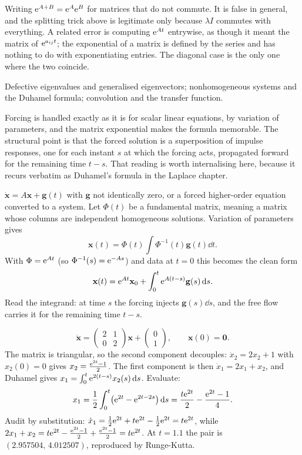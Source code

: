 \begin{trap}
Writing $\mathrm{e}^{A+B}=\mathrm{e}^{A}\mathrm{e}^{B}$ for matrices that do not commute. It is false in general, and the splitting trick above is legitimate only because $\lambda I$ commutes with everything. A related error is computing $\mathrm{e}^{At}$ entrywise, as though it meant the matrix of $\mathrm{e}^{a_{ij}t}$; the exponential of a matrix is defined by the series and has nothing to do with exponentiating entries. The diagonal case is the only one where the two coincide.
\end{trap}

\begin{seealsob}Defective eigenvalues and generalised eigenvectors; nonhomogeneous systems and the Duhamel formula; convolution and the transfer function.\end{seealsob}

Forcing is handled exactly as it is for scalar linear equations, by variation of parameters, and the matrix exponential makes the formula memorable. The structural point is that the forced solution is a superposition of impulse responses, one for each instant $s$ at which the forcing acts, propagated forward for the remaining time $t-s$. That reading is worth internalising here, because it recurs verbatim as Duhamel's formula in the Laplace chapter.

\cue $\dot{\mathbf{x}}=A\mathbf{x}+\mathbf{g}(t)$ with $\mathbf{g}$ not identically zero, or a forced higher-order equation converted to a system.
\method Let $\Phi(t)$ be a fundamental matrix, meaning a matrix whose columns are independent homogeneous solutions. Variation of parameters gives
\[\mathbf{x}(t)=\Phi(t)\int\Phi^{-1}(t)\mathbf{g}(t)\dd t.\]
With $\Phi=\mathrm{e}^{At}$ (so $\Phi^{-1}(s)=\mathrm{e}^{-As}$) and data at $t=0$ this becomes the clean form
\[\mathbf{x}(t)=\mathrm{e}^{At}\mathbf{x}_0+\int_0^{t}\mathrm{e}^{A(t-s)}\mathbf{g}(s)\,\mathrm{d} s.\]
Read the integrand: at time $s$ the forcing injects $\mathbf{g}(s)\dd s$, and the free flow carries it for the remaining time $t-s$.

\begin{worked}
\[\dot{\mathbf{x}}=\begin{pmatrix}2&1\\0&2\end{pmatrix}\mathbf{x}+\begin{pmatrix}0\\1\end{pmatrix},\qquad \mathbf{x}(0)=\mathbf{0}.\]
The matrix is triangular, so the second component decouples: $\dot x_2=2x_2+1$ with $x_2(0)=0$ gives $x_2=\tfrac{\mathrm{e}^{2t}-1}{2}$. The first component is then $\dot x_1=2x_1+x_2$, and Duhamel gives $x_1=\int_0^{t}\mathrm{e}^{2(t-s)}x_2(s)\,\mathrm{d} s$. Evaluate:
\[x_1=\frac12\int_0^{t}\bigl(\mathrm{e}^{2t}-\mathrm{e}^{2t-2s}\bigr)\,\mathrm{d} s=\frac{t\mathrm{e}^{2t}}{2}-\frac{\mathrm{e}^{2t}-1}{4}.\]
Audit by substitution: $\dot x_1=\tfrac12\mathrm{e}^{2t}+t\mathrm{e}^{2t}-\tfrac12\mathrm{e}^{2t}=t\mathrm{e}^{2t}$, while $2x_1+x_2=t\mathrm{e}^{2t}-\tfrac{\mathrm{e}^{2t}-1}{2}+\tfrac{\mathrm{e}^{2t}-1}{2}=t\mathrm{e}^{2t}$. At $t=1.1$ the pair is $(2.957504,\,4.012507)$, reproduced by Runge-Kutta.
\end{worked}

